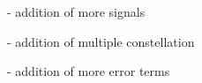 \documentclass[12pt]{report}
\begin{document}
- addition of more signals

- addition of multiple constellation

- addition of more error terms













\end{document}
